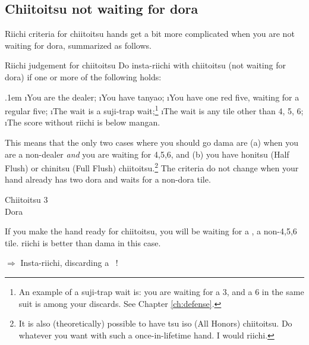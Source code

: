 \subsection{{\jap Chiitoitsu} not waiting for {\jap dora}}
{\jap Riichi} criteria for {\jap chiitoitsu} hands get a bit more complicated when you are not waiting for {\jap dora}, summarized as follows.

\begin{itembox}[c]{{\jap Riichi} judgement for {\jap chiitoitsu}}
Do insta-{\jap riichi} with {\jap chiitoitsu} (not waiting for {\jap dora}) if one or more of the following holds:

\bi\itemsep.1em
\i You are the dealer;
\i You have {\jap tanyao};
\i You have one red five, waiting for a regular five;
\i The wait is a {\jap suji}-trap wait;\footnote{An example of a {\jap suji}-trap wait is: you are waiting for a 3, and a 6 in the same suit is among your discards. See Chapter \ref{ch:defense}.} 
\i The wait is any tile other than 4, 5, 6;
\i The score without {\jap riichi} is below {\jap mangan}.
\ei \vsps
\end{itembox}

\bigskip
\noindent This means that the only two cases where you should go {\jap dama} are (a) when you are a non-dealer \emph{and} you are waiting for 4,5,6, and (b) you have {\jap honitsu} (Half Flush) or {\jap chinitsu} (Full Flush) {\jap chiitoitsu}.\footnote{It is also (theoretically) possible to have  {\jap tsu iso} (All Honors) {\jap chiitoitsu}. Do whatever you want with such a once-in-lifetime hand. I would {\jap riichi}.} The criteria do not change when your hand already has two {\jap dora} and waits for a non-{\jap dora} tile.

\bigskip
\begin{itembox}[r]{{\jap Chiitoitsu 3}}
\bp
{}\xi\xi\fa\fa~~\bei\\
\hspace{310pt}\footnotesize{\jap Dora}
\ep
\vspace{-15pt}
\end{itembox}

\noindent If you make the hand ready for {\jap chiitoitsu}, you will be waiting for a {\large{}}, a non-4,5,6 tile. {\jap riichi} is better than {\jap dama} in this case. 

\begin{center}
{\large $\Rightarrow$ Insta-{\jap riichi}, discarding a ~!}
\end{center}

